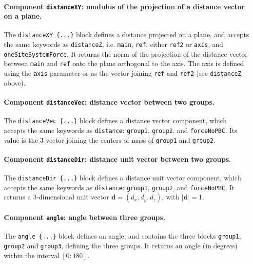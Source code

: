 \paragraph*{Component \texttt{distanceXY}: modulus of the projection
 of a distance vector on a plane.}
The \texttt{distanceXY~\{...\}} block defines a distance projected on
a plane, and accepts the same keywords as \texttt{distanceZ}, i.e.
\texttt{main}, \texttt{ref}, either \texttt{ref2} or \texttt{axis},
and \texttt{oneSiteSystemForce}.  It returns the norm of the
projection of the distance vector between \texttt{main} and
\texttt{ref} onto the plane orthogonal to the axis.  The axis is
defined using the \texttt{axis} parameter or as the vector joining
\texttt{ref} and \texttt{ref2} (see \texttt{distanceZ} above).


\paragraph*{Component \texttt{distanceVec}: distance vector
  between two groups.}  The \texttt{distanceVec~\{...\}} block defines
a distance vector component, which accepts the same keywords as
\texttt{distance}: \texttt{group1}, \texttt{group2}, and
\texttt{forceNoPBC}. Its value is the 3-vector joining the centers
of mass of \texttt{group1} and \texttt{group2}.


\paragraph*{Component \texttt{distanceDir}: distance unit vector
  between two groups.}  The \texttt{distanceDir~\{...\}} block defines
a distance unit vector component, which accepts the same keywords as
\texttt{distance}: \texttt{group1}, \texttt{group2}, and
\texttt{forceNoPBC}.  It returns a
3-dimensional unit vector $\mathbf{d} = (d_{x}, d_{y}, d_{z})$, with
$|\mathbf{d}| = 1$.


\paragraph*{Component \texttt{angle}: angle between three groups.}
The \texttt{angle~\{...\}} block defines an angle, and contains the
three blocks \texttt{group1}, \texttt{group2} and \texttt{group3}, defining
the three groups.  It returns an angle (in degrees) within the
interval $[0:180]$.


